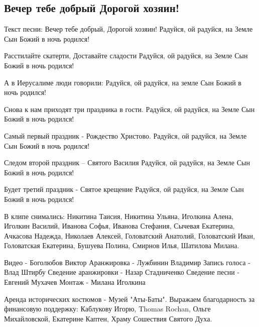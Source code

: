  
 
 
 
 

\subsection{Вечер тебе добрый Дорогой хозяин!}
\label{sec:songs.deti.vecher_tebe_dobryy}

Текст песни: 
Вечер тебе добрый,
Дорогой хозяин!
Радуйся, ой радуйся, на Земле
Сын Божий в ночь родился!

Расстилайте скатерти,
Доставайте сладости
Радуйся, ой радуйся, на Земле
Сын Божий в ночь родился!

А в Иерусалиме люди говорили:
Радуйся, ой радуйся, на земле
Сын Божий в ночь родился!

Снова к нам приходят три праздника в гости.
Радуйся, ой радуйся, на Земле
Сын Божий в ночь родился!

Самый первый праздник - Рождество Христово.
Радуйся, ой радуйся, на Земле
Сын Божий в ночь родился!

Следом второй праздник – Святого Василия
Радуйся, ой радуйся, на Земле
Сын Божий в ночь родился!

Будет третий праздник - 
Святое крещение
Радуйся, ой радуйся, на Земле
Сын Божий в ночь родился!

В клипе снимались: Никитина Таисия, Никитина Ульяна, Иголкина Алена, Иголкин Василий, Иванова Софья, Иванова Стефания, Сычевая Екатерина, Ачкасова Надежда, Николаев Алексей, Головатский Анатолий, Головатский Иван, Головатская Екатерина, Бушуева Полина, Смирнов Илья, Шатилова Милана. 

Видео - Боголюбов Виктор
Аранжировка - Лужбинин Владимир
Запись голоса - Влад Штирбу
Сведение аранжировки - Назар Стадниченко
Сведение песни - Евгений Мухачев
Монтаж - Милана Иголкина

Аренда исторических костюмов - Музей "Аты-Баты".
Выражаем благодарность за финансовую поддержку: Каблукову Игорю, Thomas Rochan, Ольге Михайловской, Екатерине Каптен, Храму Сошествия Святого Духа.
